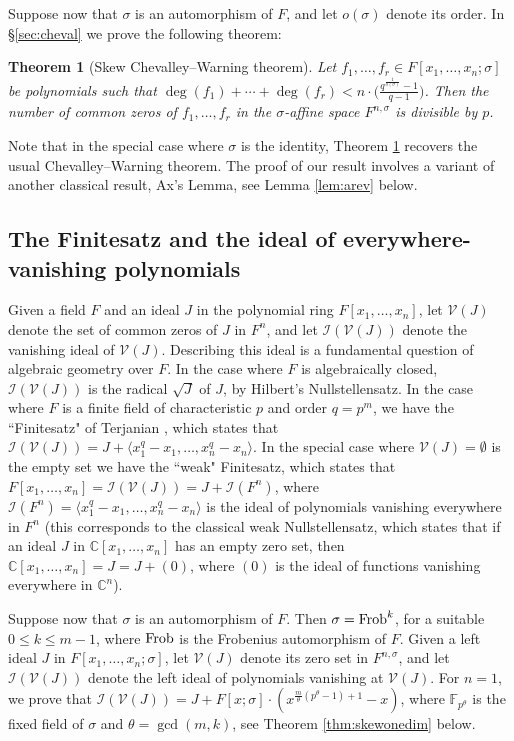 \documentclass[11pt,reqno]{amsart}
\newtheorem{thm}{Theorem}[section]
\theoremstyle{definition}
\newcommand{\F}{\mathbb{F}}
\newcommand{\C}{\mathbb{C}}
\begin{document}
Suppose now that $\sigma$ is an automorphism of $F$, and let $o(\sigma)$ denote its order. In \S\ref{sec:cheval} we prove the following theorem:

\begin{thm}[Skew Chevalley--Warning theorem]\label{thm:chev_intro}
Let $f_1,\dots,f_r \in F[x_1,\dots,x_n;\sigma]$ be polynomials such that $\deg(f_1)+\cdots+\deg(f_r)<n \cdot\big(\frac{q^{\frac{1}{o(\sigma)}}-1}{q-1}\big)$. Then the number of common zeros of $f_1,\ldots,f_r$ in the $\sigma$-affine space $F^{n,\sigma}$ is divisible by $p$.
\end{thm}

Note that in the special case where $\sigma$ is the identity, Theorem \ref{thm:chev_intro} recovers the usual Chevalley--Warning theorem. The proof of our result involves a variant of another classical result, Ax's Lemma, see Lemma \ref{lem:arev} below.

\subsection{The Finitesatz and the ideal of everywhere-vanishing polynomials}

Given a field $F$ and an ideal $J$ in the polynomial ring $F[x_1,\ldots,x_n]$, let $\mathscr{V}(J)$ denote the set of common zeros of $J$ in $F^n$, and let $\mathscr{I}(\mathscr{V}(J))$ denote the vanishing ideal of $\mathscr{V}(J)$. Describing this ideal is a fundamental question of algebraic geometry over $F$. In the case where $F$ is algebraically closed, $\mathscr{I}(\mathscr{V}(J))$ is the radical $\sqrt{J}$ of $J$, by Hilbert's Nullstellensatz. In the case where $F$ is a finite field of characteristic $p$ and order $q = p^m$, we have the ``Finitesatz" of Terjanian \cite{Ter66}, which states that $\mathscr{I}(\mathscr{V}(J)) =  J+\langle x_1^{q}-x_1,\dots,x_n^q-x_n \rangle$. In the special case where $\mathscr{V}(J) = \emptyset$  is the empty set we have the ``weak" Finitesatz, which states that $F[x_1,\ldots,x_n] = \mathscr{I}(\mathscr{V}(J)) =  J+\mathscr{I}(F^n)$, where $\mathscr{I}(F^n) = \langle x_1^{q}-x_1,\dots,x_n^q-x_n \rangle$ is the ideal of polynomials vanishing everywhere in $F^n$ (this corresponds to the classical weak Nullstellensatz, which states that if an ideal $J$ in $\C[x_1,\ldots,x_n]$ has an empty zero set, then $\C[x_1,\ldots,x_n] = J = J+ (0)$, where $(0)$ is the ideal of functions vanishing everywhere in $\C^n$).

Suppose now that $\sigma$ is an automorphism of $F$. Then $\sigma={\rm Frob}^k$, for a suitable $0 \leq k \leq m-1$, where ${\rm Frob}$ is the Frobenius automorphism of $F$. Given a left ideal $J$ in $F[x_1,\ldots,x_n;\sigma]$, let $\mathscr{V}(J)$ denote its zero set in $F^{n,\sigma}$, and let $\mathscr{I}(\mathscr{V}(J))$ denote the left ideal of polynomials vanishing at $\mathscr{V}(J)$. For $n = 1$, we prove that $\mathscr{I}(\mathscr{V}(J)) = J+F[x;\sigma]\cdot \left(x^{\frac{m}{\theta}(p^\theta-1)+1}-x\right)$, where $\F_{p^\theta}$ is the fixed field of $\sigma$ and $\theta = \gcd(m,k)$, see Theorem \ref{thm:skewonedim} below. 
\end{document}

